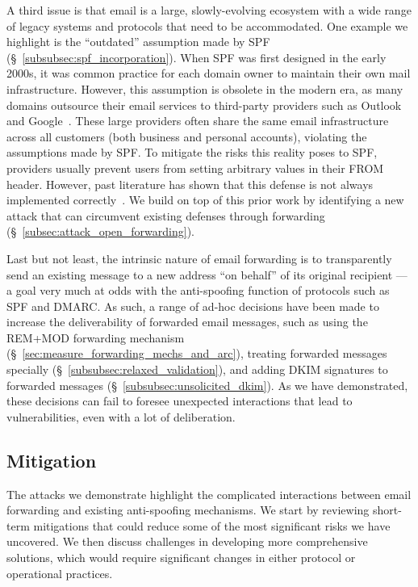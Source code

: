 A third issue is that email is a large, slowly-evolving ecosystem with a wide range of legacy systems and protocols that need to be accommodated.
One example we highlight is the ``outdated'' assumption made by SPF (\S~\ref{subsubsec:spf_incorporation}). When SPF was first designed in the early 2000s, it was common practice for each domain owner to maintain their own mail infrastructure. However, this assumption is obsolete in the modern era, as many domains outsource their email services to third-party providers such as Outlook and Google~\cite{liu2021s}. These large providers often share the same email infrastructure across all customers (both business and personal accounts), violating the assumptions made by SPF. 
To mitigate the risks this reality poses to SPF, providers 
usually prevent users from setting arbitrary values in their FROM header. However, past literature has shown that this defense is not always implemented correctly~\cite{chen2020composition}. We build on top of this prior work by identifying a new attack that can circumvent existing defenses through forwarding (\S~\ref{subsec:attack_open_forwarding}).

Last but not least, the intrinsic nature of email forwarding is to transparently send an existing message to a new address ``on behalf'' of its original recipient --- a goal very much at odds with the anti-spoofing function of protocols such as SPF and DMARC. As such, a range of ad-hoc decisions have been made to increase the deliverability of forwarded email messages, such as using the REM+MOD forwarding mechanism (\S~\ref{sec:measure_forwarding_mechs_and_arc}), treating forwarded messages specially (\S~\ref{subsubsec:relaxed_validation}), and adding DKIM signatures to forwarded messages (\S~\ref{subsubsec:unsolicited_dkim}). As we have demonstrated, 
these decisions can fail to foresee unexpected interactions that lead to vulnerabilities, even with a lot of deliberation.

\subsection{Mitigation}
The attacks we demonstrate highlight the complicated interactions
between email forwarding and existing anti-spoofing mechanisms. We start by reviewing short-term mitigations that could reduce some of the most significant risks we have uncovered. We then discuss challenges in developing more comprehensive solutions, which would require significant changes in either
protocol or operational practices.

